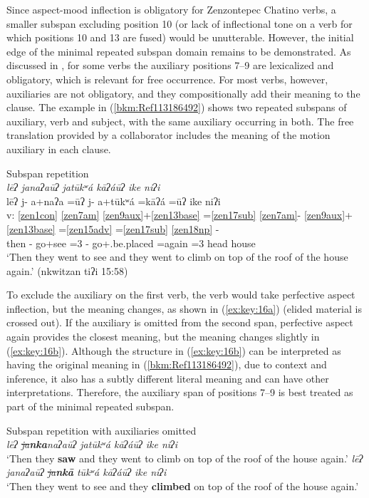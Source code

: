\documentclass[output=paper]{langscibook}
\begin{document}
Since aspect-mood inflection is obligatory for Zenzontepec Chatino verbs, a smaller subspan excluding position 10 (or lack of inflectional tone on a verb for which positions 10 and 13 are fused) would be unutterable. However, the initial edge of the minimal repeated subspan domain remains to be demonstrated. As discussed in , for some verbs the auxiliary positions 7{}--9 are lexicalized and obligatory, which is relevant for free occurrence. For most verbs, however, auxiliaries are not obligatory, and they compositionally add their meaning to the clause. The example in (\ref{bkm:Ref113186492}) shows two repeated subspans of auxiliary, verb and subject, with the same auxiliary occurring in both. The free translation provided by a collaborator includes the meaning of the motion auxiliary in each clause.

\ea\label{bkm:Ref113186492}Subspan repetition\\
\textit{lēʔ janaʔaūʔ jatūkʷá kāʔáūʔ ike niʔi} \\
\glll {} lēʔ j- a+naʔa =ūʔ j- a+tūkʷá =kāʔá =ūʔ ike niʔi\\
v: \ref{zen1con} \ref{zen7am} \ref{zen9aux}+\ref{zen13base} =\ref{zen17sub} \ref{zen7am}- \ref{zen9aux}+\ref{zen13base} =\ref{zen15adv} =\ref{zen17sub} \ref{zen18np} - \\ 
{} then \Pfv{}- go+see =3\Pl{} \Pfv{}- go+\Caus{}.be.placed =again =3\Pl{} head house  \\
\glt `Then they went to see and they went to climb on top of the roof of the house again.' (nkwitzan tiʔi 15:58)
\z

To exclude the auxiliary on the first verb, the verb would take perfective aspect inflection, but the meaning changes, as shown in (\ref{ex:key:16a}) (elided material is crossed out). If the auxiliary is omitted from the second span, perfective aspect again provides the closest meaning, but the meaning changes slightly in (\ref{ex:key:16b}). Although the structure in (\ref{ex:key:16b}) can be interpreted as having the original meaning in (\ref{bkm:Ref113186492}), due to context and inference, it also has a subtly different literal meaning and can have other interpretations. Therefore, the auxiliary span of positions 7{}--9 is best treated as part of the minimal repeated subspan.

\newpage
\ea\label{bkm:Ref113187071} Subspan repetition with auxiliaries omitted \\
            \ea\label{ex:key:16a} {
            \textit{lēʔ \sout{ja}\textbf{nka}naʔaūʔ jatūkʷá kāʔáūʔ ike niʔi}\\
            `Then they \textbf{saw} and they went to climb on top of the roof of the house again.'
            }
            \ex\label{ex:key:16b} { 
            \textit{lēʔ janaʔaūʔ \sout{ja}\textbf{nkā }tūkʷá kāʔáūʔ ike niʔi} \\
            `Then they went to see and they \textbf{climbed} on top of the roof of the house again.'
            }
            \z
\z
\end{document}
